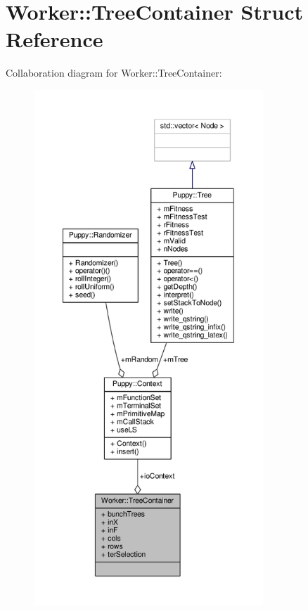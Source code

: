 \hypertarget{structWorker_1_1TreeContainer}{}\section{Worker\+:\+:Tree\+Container Struct Reference}
\label{structWorker_1_1TreeContainer}


Collaboration diagram for Worker\+:\+:Tree\+Container\+:
\nopagebreak
\begin{figure}[H]
\begin{center}
\leavevmode
\includegraphics[height=550pt]{structWorker_1_1TreeContainer__coll__graph}
\end{center}
\end{figure}
